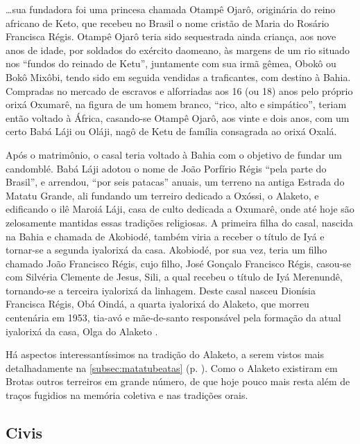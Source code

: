 \begin{citacao}
\dots sua fundadora foi uma princesa chamada Otampê Ojarô, originária do reino africano de Keto, que recebeu no Brasil o nome cristão de Maria do Rosário Francisca Régis. Otampê Ojarô teria sido sequestrada ainda criança, aos nove anos de idade, por soldados do exército daomeano, às margens de um rio situado nos ``fundos do reinado de Ketu'', juntamente com sua irmã gêmea, Obokô ou Bokô Mixôbi, tendo sido em seguida vendidas a traficantes, com destino à Bahia. Compradas no mercado de escravos e alforriadas aos 16 (ou 18) anos pelo próprio orixá Oxumarê, na figura de um homem branco, ``rico, alto e simpático'', teriam então voltado à África, casando-se Otampê Ojarô, aos vinte e dois anos, com um certo Babá Láji ou Oláji, nagô de Ketu de família consagrada ao orixá Oxalá.

Após o matrimônio, o casal teria voltado à Bahia com o objetivo de fundar um candomblé. Babá Láji adotou o nome de João Porfírio Régis ``pela parte do Brasil'', e arrendou, ``por seis patacas'' anuais, um terreno na antiga Estrada do Matatu Grande, ali fundando um terreiro dedicado a Oxóssi, o Alaketo, e edificando o ilê Maroiá Láji, casa de culto dedicada a Oxumarê, onde até hoje são zelosamente mantidas essas tradições religiosas. A primeira filha do casal, nascida na Bahia e chamada de Akobiodé, também viria a receber o título de Iyá e tornar-se a segunda iyalorixá da casa. Akobiodé, por sua vez, teria um filho chamado João Francisco Régis, cujo filho, José Gonçalo Francisco Régis, casou-se com Silvéria Clemente de Jesus, Sili, a qual recebeu o título de Iyá Merenundê, tornando-se a terceira iyalorixá da linhagem. Deste casal nasceu Dionísia Francisca Régis, Obá Oindá, a quarta iyalorixá do Alaketo, que morreu centenária em 1953, tia-avó e mãe-de-santo responsável pela formação da atual iyalorixá da casa, Olga do Alaketo \cite[p.~345-346]{silveira_alaketo_2003}.
\end{citacao}

Há aspectos interessantíssimos na tradição do Alaketo, a serem vistos mais detalhadamente na \autoref{subsec:matatubeatas} (p. \pageref{subsec:matatubeatas}). Como o Alaketo existiram em Brotas outros terreiros em grande número, de que hoje pouco mais resta além de traços fugidios na memória coletiva e nas tradições orais.

\subsection{Civis}\label{subsec:pontciv}

